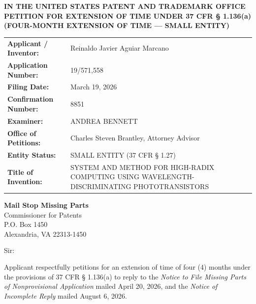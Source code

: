 \documentclass[11pt,letterpaper]{article}
\begin{document}
\thispagestyle{empty}

\begin{center}
    \textbf{\large IN THE UNITED STATES PATENT AND TRADEMARK OFFICE} \\
    \vspace{0.3cm}
    \textbf{\large PETITION FOR EXTENSION OF TIME UNDER 37 CFR \S{} 1.136(a)} \\
    \textbf{\normalsize (FOUR-MONTH EXTENSION OF TIME --- SMALL ENTITY)}
\end{center}

\vspace{0.4cm}
\noindent\begin{tabular}{p{2.3in}p{4.0in}}
\textbf{Applicant / Inventor:} & Reinaldo Javier Aguiar Marcano \\
\textbf{Application Number:} & 19/571,558 \\
\textbf{Filing Date:} & March 19, 2026 \\
\textbf{Confirmation Number:} & 8851 \\
\textbf{Examiner:} & ANDREA BENNETT \\
\textbf{Office of Petitions:} & Charles Steven Brantley, Attorney Advisor \\
\textbf{Entity Status:} & SMALL ENTITY (37 CFR \S{} 1.27) \\
\textbf{Title of Invention:} & SYSTEM AND METHOD FOR HIGH-RADIX COMPUTING USING WAVELENGTH-DISCRIMINATING PHOTOTRANSISTORS \\
\end{tabular}

\vspace{0.5cm}
\noindent\textbf{Mail Stop Missing Parts} \\
Commissioner for Patents \\
P.O. Box 1450 \\
Alexandria, VA 22313-1450

\vspace{0.2cm}
Sir:

Applicant respectfully petitions for an extension of time of four (4) months under the provisions of 37 CFR \S{} 1.136(a) to reply to the \textit{Notice to File Missing Parts of Nonprovisional Application} mailed April 20, 2026, and the \textit{Notice of Incomplete Reply} mailed August 6, 2026.
\end{document}
